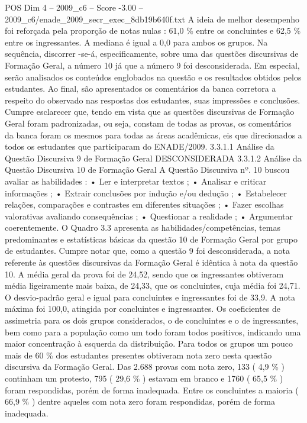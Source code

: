 \begin{textsample}{POS Dim 4 – 2009\_c6 – Score -3.00 – 2009\_c6/enade\_2009\_secr\_exec\_8db19b640f.txt}
A ideia de melhor desempenho foi reforçada pela proporção de notas nulas : 61,0 \% entre os concluintes e 62,5 \% entre os ingressantes.
A mediana é igual a 0,0 para ambos os grupos.
Na sequência, discorrer -se-á, especificamente, sobre uma das questões discursivas de Formação Geral, a número 10 já que a número 9 foi desconsiderada.
Em especial, serão analisados os conteúdos englobados na questão e os resultados obtidos pelos estudantes.
Ao final, são apresentados os comentários da banca corretora a respeito do observado nas respostas dos estudantes, suas impressões e conclusões.
Cumpre esclarecer que, tendo em vista que as questões discursivas de Formação Geral foram padronizadas, ou seja, constam de todas as provas, os comentários da banca foram os mesmos para todas as áreas acadêmicas, eis que direcionados a todos os estudantes que participaram do ENADE/2009. 3.3.1.1 Análise da Questão Discursiva 9 de Formação Geral DESCONSIDERADA 3.3.1.2 Análise da Questão Discursiva 10 de Formação Geral A Questão Discursiva nº. 10 buscou avaliar as habilidades : • Ler e interpretar textos ; • Analisar e criticar informações ; • Extrair conclusões por indução e/ou dedução ; • Estabelecer relações, comparações e contrastes em diferentes situações ; • Fazer escolhas valorativas avaliando consequências ; • Questionar a realidade ; • Argumentar coerentemente.
O Quadro 3.3 apresenta as habilidades/competências, temas predominantes e estatísticas básicas da questão 10 de Formação Geral por grupo de estudantes.
Cumpre notar que, como a questão 9 foi desconsiderada, a nota referente às questões discursivas da Formação Geral é idêntica à nota da questão 10.
A média geral da prova foi de 24,52, sendo que os ingressantes obtiveram média ligeiramente mais baixa, de 24,33, que os concluintes, cuja média foi 24,71.
O desvio-padrão geral e igual para concluintes e ingressantes foi de 33,9.
A nota máxima foi 100,0, atingida por concluintes e ingressantes.
Os coeficientes de assimetria para os dois grupos considerados, o de concluintes e o de ingressantes, bem como para a população como um todo foram todos positivos, indicando uma maior concentração à esquerda da distribuição.
Para todos os grupos um pouco mais de 60 \% dos estudantes presentes obtiveram nota zero nesta questão discursiva da Formação Geral.
Das 2.688 provas com nota zero, 133 ( 4,9 \% ) continham um protesto, 795 ( 29,6 \% ) estavam em branco e 1760 ( 65,5 \% ) foram respondidas, porém de forma inadequada.
Entre os concluintes a maioria ( 66,9 \% ) dentre aqueles com nota zero foram respondidas, porém de forma inadequada.

\end{textsample}
